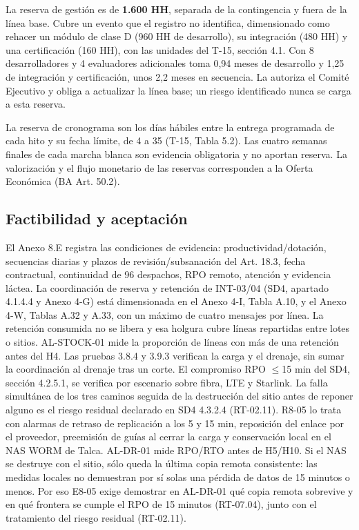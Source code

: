 La reserva de gestión es de \textbf{1.600 HH}, separada de la contingencia y fuera de la línea base. Cubre un evento que el registro no identifica, dimensionado como rehacer un módulo de clase D (960 HH de desarrollo), su integración (480 HH) y una certificación (160 HH), con las unidades del T-15, sección 4.1. Con 8 desarrolladores y 4 evaluadores adicionales toma 0,94 meses de desarrollo y 1,25 de integración y certificación, unos 2,2 meses en secuencia. La autoriza el Comité Ejecutivo y obliga a actualizar la línea base; un riesgo identificado nunca se carga a esta reserva.

La reserva de cronograma son los días hábiles entre la entrega programada de cada hito y su fecha límite, de 4 a 35 (T-15, Tabla 5.2). Las cuatro semanas finales de cada marcha blanca son evidencia obligatoria y no aportan reserva. La valorización y el flujo monetario de las reservas corresponden a la Oferta Económica (BA Art. 50.2).

\subsection{Factibilidad y aceptación}

El Anexo 8.E registra las condiciones de evidencia: productividad/dotación, secuencias diarias y plazos de revisión/subsanación del Art. 18.3, fecha contractual, continuidad de 96 despachos, RPO remoto, atención y evidencia láctea. La coordinación de reserva y retención de INT-03/04 (SD4, apartado 4.1.4.4 y Anexo 4-G) está dimensionada en el Anexo 4-I, Tabla A.10, y el Anexo 4-W, Tablas A.32 y A.33, con un máximo de cuatro mensajes por línea. La retención consumida no se libera y esa holgura cubre líneas repartidas entre lotes o sitios. AL-STOCK-01 mide la proporción de líneas con más de una retención antes del H4. Las pruebas 3.8.4 y 3.9.3 verifican la carga y el drenaje, sin sumar la coordinación al drenaje tras un corte. El compromiso RPO \ensuremath{\leq}15 min del SD4, sección 4.2.5.1, se verifica por escenario sobre fibra, LTE y Starlink. La falla simultánea de los tres caminos seguida de la destrucción del sitio antes de reponer alguno es el riesgo residual declarado en SD4 4.3.2.4 (RT-02.11). R8-05 lo trata con alarmas de retraso de replicación a los 5 y 15 min, reposición del enlace por el proveedor, preemisión de guías al cerrar la carga y conservación local en el NAS WORM de Talca. AL-DR-01 mide RPO/RTO antes de H5/H10. Si el NAS se destruye con el sitio, sólo queda la última copia remota consistente: las medidas locales no demuestran por sí solas una pérdida de datos de 15 minutos o menos. Por eso E8-05 exige demostrar en AL-DR-01 qué copia remota sobrevive y en qué frontera se cumple el RPO de 15 minutos (RT-07.04), junto con el tratamiento del riesgo residual (RT-02.11).

